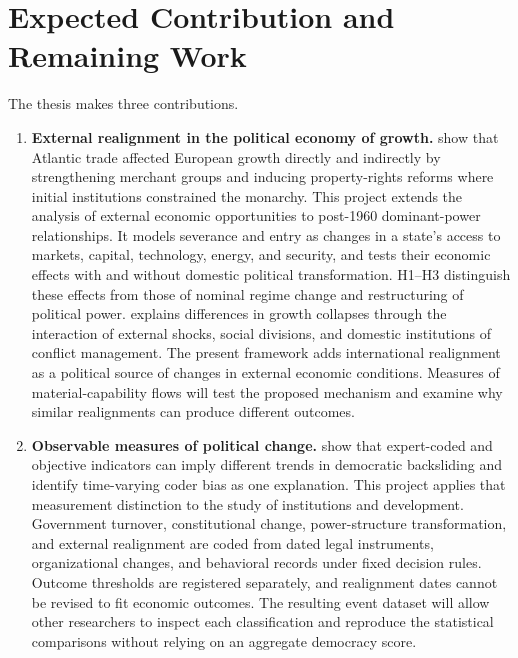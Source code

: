\documentclass[11pt]{article}
\begin{document}
\section{Expected Contribution and Remaining Work}

The thesis makes three contributions.

\begin{enumerate}[leftmargin=1.5em]
    \item \textbf{External realignment in the political economy of growth.} \textcite{acemoglu_johnson_robinson_2005} show that Atlantic trade affected European growth directly and indirectly by strengthening merchant groups and inducing property-rights reforms where initial institutions constrained the monarchy. This project extends the analysis of external economic opportunities to post-1960 dominant-power relationships. It models severance and entry as changes in a state's access to markets, capital, technology, energy, and security, and tests their economic effects with and without domestic political transformation. H1--H3 distinguish these effects from those of nominal regime change and restructuring of political power. \textcite{rodrik_1999} explains differences in growth collapses through the interaction of external shocks, social divisions, and domestic institutions of conflict management. The present framework adds international realignment as a political source of changes in external economic conditions. Measures of material-capability flows will test the proposed mechanism and examine why similar realignments can produce different outcomes.

    \item \textbf{Observable measures of political change.} \textcite{little_meng_2024} show that expert-coded and objective indicators can imply different trends in democratic backsliding and identify time-varying coder bias as one explanation. This project applies that measurement distinction to the study of institutions and development. Government turnover, constitutional change, power-structure transformation, and external realignment are coded from dated legal instruments, organizational changes, and behavioral records under fixed decision rules. Outcome thresholds are registered separately, and realignment dates cannot be revised to fit economic outcomes. The resulting event dataset will allow other researchers to inspect each classification and reproduce the statistical comparisons without relying on an aggregate democracy score.


\end{enumerate}
\end{document}
